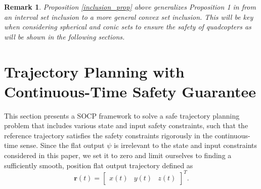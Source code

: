 \documentclass[journal,10pt]{IEEEtran}
\newtheorem{remark}{\bfseries Remark}
\newcommand{\vect}[1]{\boldsymbol{\mathbf{#1}}}
\newcommand{\mat}[1]{\begin{bmatrix} #1 \end{bmatrix}}
\begin{document}
\begin{remark}
Proposition \ref{inclusion_prop} above generalizes Proposition 1 in \cite{Constrained_trajectory} from an interval set inclusion to a more general convex set inclusion. This will be key when considering spherical and conic sets to ensure the safety of quadcopters as will be shown in the following sections.
\end{remark}

\section{Trajectory Planning with Continuous-Time Safety Guarantee} \label{sec:traj}
This section presents a SOCP framework to solve a safe trajectory planning problem that includes various state and input safety constraints, such that the reference trajectory  satisfies the safety constraints rigorously in the continuous-time sense. 
Since the flat output $\psi$ is irrelevant to the state and input constraints considered in this paper, we set it to zero and limit ourselves to finding a sufficiently smooth, position flat output trajectory defined as
$$
\vect{r}(t) = \mat{x(t) & y(t) & z(t)}^T.
$$ 
\end{document}
